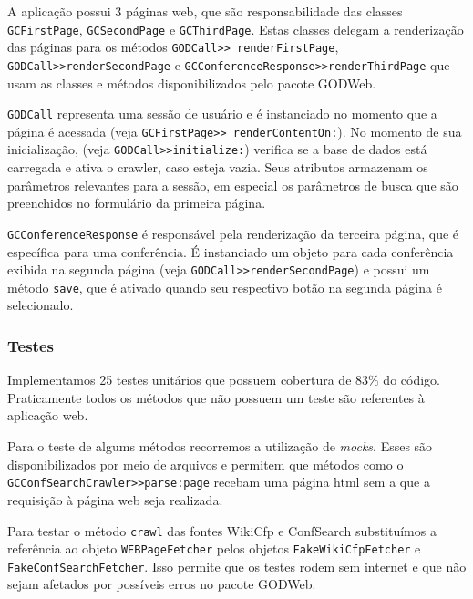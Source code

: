 A aplicação possui 3 páginas web, que são responsabilidade das classes \texttt{GCFirstPage}, \texttt{GCSecondPage} e \texttt{GCThirdPage}. Estas classes delegam a renderização das páginas para os métodos \texttt{GODCall>> renderFirstPage}, \texttt{GODCall>>renderSecondPage} e \texttt{GCConferenceResponse>>renderThirdPage} que usam as classes e métodos disponibilizados pelo pacote GODWeb.

\texttt{GODCall} representa uma sessão de usuário e é instanciado no momento que a página é acessada (veja \texttt{GCFirstPage>> renderContentOn:}). No momento de sua inicialização, (veja \texttt{GODCall>>initialize:}) verifica se a base de dados está carregada e ativa o crawler, caso esteja vazia. Seus atributos armazenam os parâmetros relevantes para a sessão, em especial os parâmetros de busca que são preenchidos no formulário da primeira página.

\texttt{GCConferenceResponse} é responsável pela renderização da terceira página, que é específica para uma conferência. É instanciado um objeto para cada conferência exibida na segunda página (veja \texttt{GODCall>>renderSecondPage}) e possui um método \texttt{save}, que é ativado quando seu respectivo botão na segunda página é selecionado.

\subsubsection{Testes}%
Implementamos 25 testes unitários que possuem cobertura de 83\% do código. Praticamente todos os métodos que não possuem um teste são referentes à aplicação web.

Para o teste de algums métodos recorremos a utilização de \textit{mocks}. Esses são disponibilizados por meio de arquivos e permitem que métodos como o \texttt{GCConfSearchCrawler>>parse:page} recebam uma página html sem a que a requisição à página 
web seja realizada.

Para testar o método \texttt{crawl} das fontes WikiCfp e ConfSearch substituímos a referência ao objeto \texttt{WEBPageFetcher} pelos objetos \texttt{FakeWikiCfpFetcher} e \texttt{FakeConfSearchFetcher}. Isso permite que os testes rodem sem internet e que não sejam afetados por possíveis erros no pacote GODWeb.

